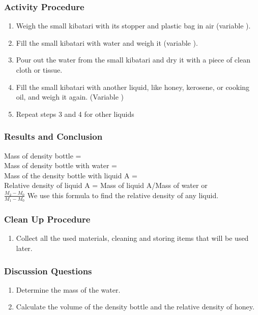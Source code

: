 \subsubsection*{Activity Procedure}
\begin{enumerate}
\item{Weigh the small kibatari with its stopper and plastic bag in air (variable ).} 
\item{Fill the small kibatari with water and weigh it (variable ).} 
\item{Pour out the water from the small kibatari and dry it with a piece of clean cloth or tissue.} 
\item{Fill the small kibatari with another liquid, like honey, kerosene, or cooking oil, and weigh it again. (Variable )}
\item{Repeat steps 3 and 4 for other liquids}
\end{enumerate}

\subsubsection*{Results and Conclusion}
Mass of density bottle = \\
Mass of density bottle with water = \\
Mass of the density bottle with liquid A = \\
Relative density of liquid A = Mass of liquid A/Mass of water or\\
$\frac{M_2-M_0}{M_1-M_0}$
We use this formula to find the relative density of any liquid.

\subsubsection*{Clean Up Procedure}
\begin{enumerate}
\item{Collect all the used materials, cleaning and storing items that will be used later.} 
\end{enumerate}

\subsubsection*{Discussion Questions}
\begin{enumerate}
\item{Determine the mass of the water.} 
\item{Calculate the volume of the density bottle and the relative density of honey.} 
\end{enumerate}


